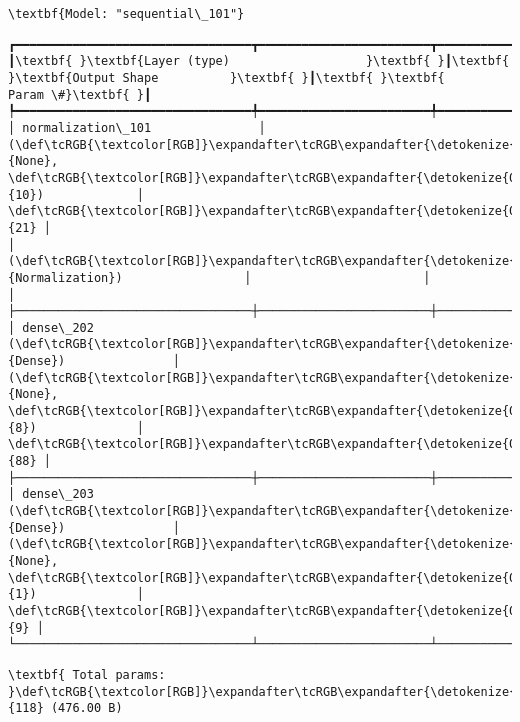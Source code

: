 \documentclass[11pt]{article}
\begin{document}
    
    \begin{Verbatim}[commandchars=\\\{\}]
\textbf{Model: "sequential\_101"}

    \end{Verbatim}

    
    
    \begin{Verbatim}[commandchars=\\\{\}]
┏━━━━━━━━━━━━━━━━━━━━━━━━━━━━━━━━━┳━━━━━━━━━━━━━━━━━━━━━━━━┳━━━━━━━━━━━━━━━┓
┃\textbf{ }\textbf{Layer (type)                   }\textbf{ }┃\textbf{ }\textbf{Output Shape          }\textbf{ }┃\textbf{ }\textbf{      Param \#}\textbf{ }┃
┡━━━━━━━━━━━━━━━━━━━━━━━━━━━━━━━━━╇━━━━━━━━━━━━━━━━━━━━━━━━╇━━━━━━━━━━━━━━━┩
│ normalization\_101               │ (\def\tcRGB{\textcolor[RGB]}\expandafter\tcRGB\expandafter{\detokenize{0,215,255}}{None}, \def\tcRGB{\textcolor[RGB]}\expandafter\tcRGB\expandafter{\detokenize{0,175,0}}{10})             │            \def\tcRGB{\textcolor[RGB]}\expandafter\tcRGB\expandafter{\detokenize{0,175,0}}{21} │
│ (\def\tcRGB{\textcolor[RGB]}\expandafter\tcRGB\expandafter{\detokenize{0,135,255}}{Normalization})                 │                        │               │
├─────────────────────────────────┼────────────────────────┼───────────────┤
│ dense\_202 (\def\tcRGB{\textcolor[RGB]}\expandafter\tcRGB\expandafter{\detokenize{0,135,255}}{Dense})               │ (\def\tcRGB{\textcolor[RGB]}\expandafter\tcRGB\expandafter{\detokenize{0,215,255}}{None}, \def\tcRGB{\textcolor[RGB]}\expandafter\tcRGB\expandafter{\detokenize{0,175,0}}{8})              │            \def\tcRGB{\textcolor[RGB]}\expandafter\tcRGB\expandafter{\detokenize{0,175,0}}{88} │
├─────────────────────────────────┼────────────────────────┼───────────────┤
│ dense\_203 (\def\tcRGB{\textcolor[RGB]}\expandafter\tcRGB\expandafter{\detokenize{0,135,255}}{Dense})               │ (\def\tcRGB{\textcolor[RGB]}\expandafter\tcRGB\expandafter{\detokenize{0,215,255}}{None}, \def\tcRGB{\textcolor[RGB]}\expandafter\tcRGB\expandafter{\detokenize{0,175,0}}{1})              │             \def\tcRGB{\textcolor[RGB]}\expandafter\tcRGB\expandafter{\detokenize{0,175,0}}{9} │
└─────────────────────────────────┴────────────────────────┴───────────────┘

    \end{Verbatim}

    
    
    \begin{Verbatim}[commandchars=\\\{\}]
\textbf{ Total params: }\def\tcRGB{\textcolor[RGB]}\expandafter\tcRGB\expandafter{\detokenize{0,175,0}}{118} (476.00 B)

    \end{Verbatim}
\end{document}
